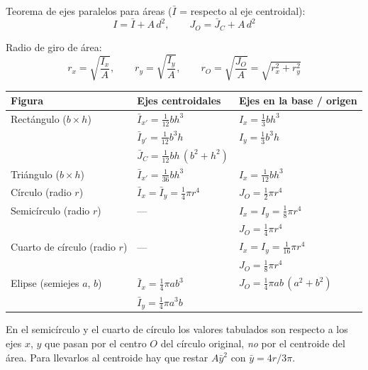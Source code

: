 \documentclass[10pt,a4paper]{article}
\begin{document}
Teorema de ejes paralelos para áreas ($\bar{I}$ = respecto al eje centroidal):
\begin{equation*}
  I = \bar{I} + A\,d^{2},
  \qquad
  J_O = \bar{J}_C + A\,d^{2}
\end{equation*}

Radio de giro de área:
\begin{equation*}
  r_x = \sqrt{\frac{I_x}{A}},
  \qquad
  r_y = \sqrt{\frac{I_y}{A}},
  \qquad
  r_O = \sqrt{\frac{J_O}{A}} = \sqrt{r_x^{2}+r_y^{2}}
\end{equation*}

\begin{center}\renewcommand{\arraystretch}{1.45}\normalsize
\begin{tabular}{@{}lll@{}}
\toprule
\textbf{Figura} & \textbf{Ejes centroidales} & \textbf{Ejes en la base / origen} \\
\midrule
Rectángulo ($b\times h$)
  & $\bar{I}_{x'} = \frac{1}{12}bh^{3}$
  & $I_{x} = \frac{1}{3}bh^{3}$ \\
  & $\bar{I}_{y'} = \frac{1}{12}b^{3}h$
  & $I_{y} = \frac{1}{3}b^{3}h$ \\
  & $\bar{J}_{C} = \frac{1}{12}bh\,(b^{2}+h^{2})$
  & \\
\midrule
Triángulo ($b\times h$)
  & $\bar{I}_{x'} = \frac{1}{36}bh^{3}$
  & $I_{x} = \frac{1}{12}bh^{3}$ \\
\midrule
Círculo (radio $r$)
  & $\bar{I}_{x} = \bar{I}_{y} = \frac{1}{4}\pi r^{4}$
  & $J_{O} = \frac{1}{2}\pi r^{4}$ \\
\midrule
Semicírculo (radio $r$)
  & ---
  & $I_{x} = I_{y} = \frac{1}{8}\pi r^{4}$ \\
  &
  & $J_{O} = \frac{1}{4}\pi r^{4}$ \\
\midrule
Cuarto de círculo (radio $r$)
  & ---
  & $I_{x} = I_{y} = \frac{1}{16}\pi r^{4}$ \\
  &
  & $J_{O} = \frac{1}{8}\pi r^{4}$ \\
\midrule
Elipse (semiejes $a$, $b$)
  & $\bar{I}_{x} = \frac{1}{4}\pi ab^{3}$
  & $J_{O} = \frac{1}{4}\pi ab\,(a^{2}+b^{2})$ \\
  & $\bar{I}_{y} = \frac{1}{4}\pi a^{3}b$
  & \\
\bottomrule
\end{tabular}
\end{center}

\vspace{1mm}
En el semicírculo y el cuarto de círculo los valores tabulados son respecto a los
ejes $x$, $y$ que pasan por el centro $O$ del círculo original, \emph{no} por el
centroide del área. Para llevarlos al centroide hay que restar $A\bar{y}^{2}$ con
$\bar{y} = 4r/3\pi$.
\end{document}
